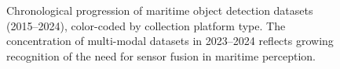 \begin{figure}[t]
\caption{Chronological progression of maritime object detection datasets (2015--2024), color-coded by collection platform type. The concentration of multi-modal datasets in 2023--2024 reflects growing recognition of the need for sensor fusion in maritime perception.}
\label{fig:dataset_timeline}
\end{figure}
